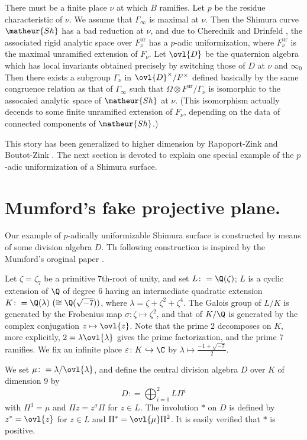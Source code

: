 There must be a finite place $\nu$ at which $B$ ramifies.
Let $p$ be the residue characteristic of $\nu$.
We assume that $\Gamma_{\infty}$ is maximal at $\nu$.
Then the Shimura curve $\matheur{Sh}$ has a bad reduction 
at $\nu$, and due to Cherednik \cite{uoacbdsopwcq} and Drinfeld
\cite{copsr}, the associated rigid analytic space over 
$F^{\mathrm{ur}}_{\nu}$ has a $p$-adic uniformization, where
$F^{\mathrm{ur}}_{\nu}$ is the maximal unramified extension of
$F_{\nu}$.
Let $\ovl{D}$ be the quaternion algebra which has local invariants
obtained precisely by switching those of $D$ at $\nu$ and $\infty_0$
Then there exists a subgroup $\Gamma_{\nu}$ in 
$\ovl{D}^{\times}/F^{\times}$ defined basically by the same congruence 
relation as that of $\Gamma_{\infty}$ such that
$\Omega\otimes F^{\mathrm{ur}}/\Gamma_{\nu}$ is isomorphic to the
assocaied analytic space of $\matheur{Sh}$ at $\nu$.
(This isomorphism actually decends to some finite unramified extension
of $F_{\nu}$, depending on the data of connected components of
$\matheur{Sh}$.)

This story has been generalized to higher dimension by Rapoport-Zink
\cite{psfpg} and Boutot-Zink \cite{tpuosc}.
The next section is devoted to explain one special example of the 
$p$-adic uniformization of a Shimura surface.

%
\section{Mumford's fake projective plane.}
%
Our example of $p$-adically uniformizable Shimura surface is constructed 
by means of some division algebra $D$. Th following construction is
inspired by the Mumford's oroginal paper \cite{aaswkak9pq0}.

Let $\zeta=\zeta_7$ be a primitive $7$th-root of unity, and
set $L\colon=\Q(\zeta)$; $L$ is a cyclic extension of $\Q$ of degree $6$
having an intermediate quadratic extension $K\colon=\Q(\lambda)\ (\cong
\Q(\sqrt{-7}))$, where $\lambda=\zeta+\zeta^2+\zeta^4$.
The Galois group of $L/K$ is generated by the Frobenius map $\sigma\colon
\zeta\mapsto\zeta^2$, and that of $K/\Q$ is generated by the complex 
conjugation $z\mapsto\ovl{z}$.
Note that the prime $2$ decomposes on $K$, more explicitly, 
$2=\lambda\ovl{\lambda}$ gives the prime factorization, and the prime
$7$ ramifies.
We fix an infinite place $\varepsilon\colon K\hookrightarrow\C$ by
$\lambda\mapsto\frac{-1+\sqrt{-7}}{2}$.

We set $\mu\colon=\lambda/\ovl{\lambda}$, and define the central
division algebra $D$ over $K$ of dimension $9$ by
$$
D\colon=\bigoplus^2_{i=0}L\Pi^i
$$
with $\Pi^3=\mu$ and $\Pi z=z^{\sigma}\Pi$ for $z\in L$.
The involution $\ast$ on $D$ is defined by $z^{\ast}=\ovl{z}$ for $z\in L$
and $\Pi^{\ast}=\ovl{\mu}\Pi^2$.
It is easily verified that $\ast$ is positive.

